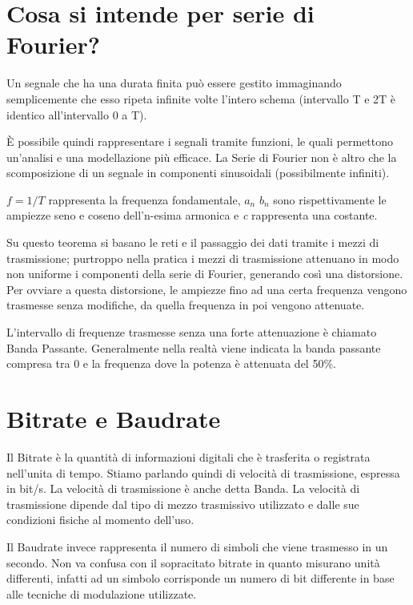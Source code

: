 \section{Cosa si intende per serie di Fourier?}
Un segnale che ha una durata finita può essere gestito immaginando semplicemente che esso ripeta infinite volte l’intero schema (intervallo T e 2T è identico all’intervallo 0 a T).

È possibile quindi rappresentare i segnali tramite funzioni, le quali permettono un’analisi e una modellazione più efficace.
La Serie di Fourier non è altro che la scomposizione di un segnale in componenti sinusoidali (possibilmente infiniti).


 
$f=1/T$ rappresenta la frequenza fondamentale, $a_n$  $b_n$  sono rispettivamente le ampiezze seno e coseno dell’n-esima armonica e \textit{c} rappresenta una costante.

Su questo teorema si basano le reti e il passaggio dei dati tramite i mezzi di trasmissione; purtroppo 	nella pratica i mezzi di trasmissione attenuano in modo non uniforme i componenti della serie di Fourier, generando così una distorsione. Per ovviare a questa distorsione, le ampiezze fino ad una certa frequenza vengono trasmesse senza modifiche, da quella frequenza in poi vengono attenuate.

L’intervallo di frequenze trasmesse senza una forte attenuazione è chiamato Banda Passante.
Generalmente nella realtà viene indicata la banda passante compresa tra 0 e la frequenza dove la potenza è attenuata del 50\%.
\section{Bitrate e Baudrate}

Il Bitrate è la quantità di informazioni digitali che è trasferita o registrata nell’unita di tempo.
Stiamo parlando quindi di velocità di trasmissione, espressa in bit/s. La velocità di trasmissione è anche detta Banda. La velocità di trasmissione dipende dal tipo di mezzo trasmissivo utilizzato e dalle sue condizioni fisiche al momento dell’uso.

Il Baudrate invece rappresenta il numero di simboli che viene trasmesso in un secondo. Non va confusa con il sopracitato bitrate in quanto misurano unità differenti, infatti ad un simbolo corrisponde un numero di bit differente in base alle tecniche di modulazione utilizzate.

